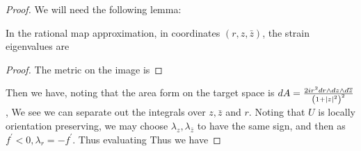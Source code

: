 \documentclass{article}
\begin{document}
\begin{proof}
We will need the following lemma:
\begin{lemma}
In the rational map approximation, in coordinates $(r,z,\bar{z})$, the strain eigenvalues are 
\end{lemma}
\begin{proof}
The metric on the image is 
\end{proof}
Then we have, noting that the area form on the target space is $dA = \frac{2i r^2 dr \wedge dz \wedge d\overline{z}}{\left( 1+\left\lvert z \right\rvert^2 \right)^2}$,
We see we can separate out the integrals over $z,\bar{z}$ and $r$. Noting that $U$ is locally orientation preserving, we may choose $\lambda_z,\lambda_{\bar{z}}$ to have the same sign, and then as $f^\prime < 0, \lambda_r = -f^\prime$. Thus evaluating 
Thus we have 
\end{proof}
\end{document}
